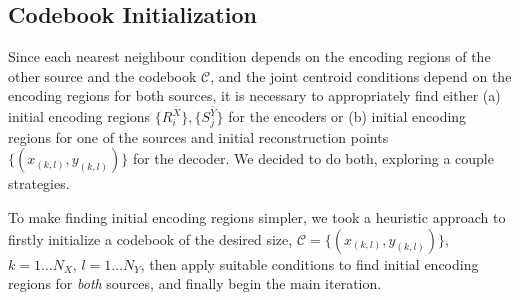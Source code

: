 



\subsection{Codebook Initialization}

Since each nearest neighbour condition depends on the encoding regions of the other source and the codebook $\mathcal C$, and the joint centroid conditions depend on the encoding regions for both sources, it is necessary to appropriately find either (a) initial encoding regions $\{R_i^{\bar X}\}, \{S_j^{\bar Y}\}$ for the encoders or (b) initial encoding regions for one of the sources and initial reconstruction points $\{(x_{(k,l)}, y_{(k,l)})\}$ for the decoder. We decided to do both, exploring a couple strategies.


To make finding initial encoding regions simpler, we took a heuristic approach to firstly initialize a codebook of the desired size, $\mathcal C=\{(x_{(k,l)}, y_{(k,l)})\}$, $k=1\ldots N_X$, $l=1\ldots N_Y$, then apply suitable conditions to find initial encoding regions for \emph{both} sources, and finally begin the main iteration.

